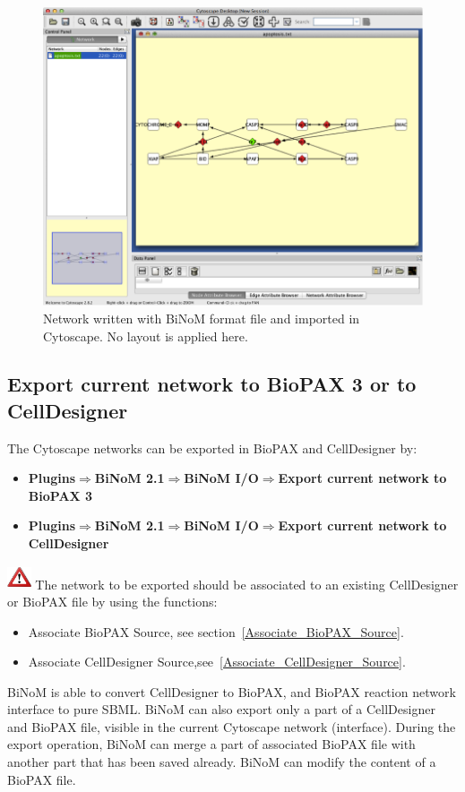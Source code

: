 \begin{figure}
\centering
\includegraphics[width=1\textwidth]{graphics/Import_brff.png} 
\caption{Network written with BiNoM format file and imported in Cytoscape. No layout is applied here.}
\label{Network_format_file}
\end{figure}



\subsection{Export current network to BioPAX 3 or to CellDesigner} \label{Export_current_network}
The Cytoscape networks can be exported in BioPAX and CellDesigner by:
\begin{itemize}
\item \textbf{Plugins$\Rightarrow$BiNoM 2.1$\Rightarrow$BiNoM I/O$\Rightarrow$Export current network to BioPAX 3}
\item \textbf{Plugins$\Rightarrow$BiNoM 2.1$\Rightarrow$BiNoM I/O$\Rightarrow$Export current network to CellDesigner}
\end{itemize}
\includegraphics[width=20pt,height=20pt]{graphics/warning} The network to be exported should be associated to an existing CellDesigner or BioPAX file by using the functions:
\begin{itemize}
\item Associate BioPAX Source, see section~\ref{Associate_BioPAX_Source}.
\item Associate CellDesigner Source,see~\ref{Associate_CellDesigner_Source}.
\end{itemize}
BiNoM is able to convert CellDesigner to BioPAX, and BioPAX
reaction network interface to pure SBML. BiNoM can also export only a
part of a CellDesigner and BioPAX file, visible in the current Cytoscape network
(interface). During the export operation, BiNoM can merge a part of
associated BioPAX file with another part that has been saved already. BiNoM can modify the
content of a BioPAX file. \\\\

